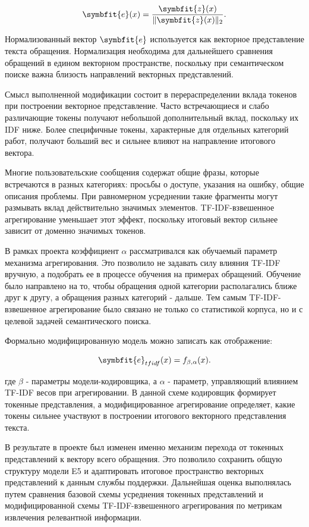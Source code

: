 \documentclass[14pt,a4paper]{extarticle}
\numberwithin{figure}{section}
\numberwithin{table}{section}
\begin{document}
\begin{equation}\symbfit{e}(x)=\frac{\symbfit{z}(x)}{\|\symbfit{z}(x)\|_2}.\end{equation}

Нормализованный вектор \(\symbfit{e}\) используется как векторное представление текста обращения.
Нормализация необходима для дальнейшего сравнения обращений в едином
векторном пространстве, поскольку при семантическом поиске важна
близость направлений векторных представлений.

Смысл выполненной модификации состоит в перераспределении вклада токенов
при построении векторное представление. Часто встречающиеся и слабо различающие токены
получают небольшой дополнительный вклад, поскольку их IDF ниже. Более
специфичные токены, характерные для отдельных категорий работ, получают
больший вес и сильнее влияют на направление итогового вектора.

Многие пользовательские сообщения содержат общие фразы, которые
встречаются в разных категориях: просьбы о доступе, указания на ошибку,
общие описания проблемы. При равномерном усреднении такие фрагменты
могут размывать вклад действительно значимых элементов.
TF-IDF-взвешенное агрегирование уменьшает этот эффект, поскольку итоговый
вектор сильнее зависит от доменно значимых токенов.

В рамках проекта коэффициент \(\alpha\) рассматривался как обучаемый параметр
механизма агрегирования. Это позволило не задавать силу влияния TF-IDF
вручную, а подобрать ее в процессе обучения на примерах обращений.
Обучение было направлено на то, чтобы обращения одной категории
располагались ближе друг к другу, а обращения разных категорий - дальше.
Тем самым TF-IDF-взвешенное агрегирование было связано не только со статистикой
корпуса, но и с целевой задачей семантического поиска.

Формально модифицированную модель можно записать как отображение:

\begin{equation}\symbfit{e}_{tfidf}(x)=f_{\beta,\alpha}(x).\label{eq:modified-model}\end{equation}

где \(\beta\) - параметры модели-кодировщика, а \(\alpha\) - параметр, управляющий
влиянием TF-IDF весов при агрегировании. В данной схеме кодировщик формирует
токенные представления, а модифицированное агрегирование определяет, какие
токены сильнее участвуют в построении итогового векторного представления текста.

В результате в проекте был изменен именно механизм перехода от токенных
представлений к вектору всего обращения. Это позволило сохранить общую
структуру модели E5 и адаптировать итоговое пространство векторных представлений к
данным службы поддержки. Дальнейшая оценка выполнялась путем сравнения
базовой схемы усреднения токенных представлений и модифицированной схемы TF-IDF-взвешенного
агрегирования по метрикам извлечения релевантной информации.
\end{document}
